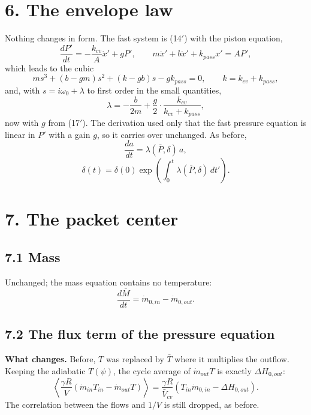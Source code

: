 \documentclass[11pt]{article}
\begin{document}
\section*{6. The envelope law}

Nothing changes in form. The fast system is (14$'$) with the piston equation,
\begin{equation}
\frac{dP'}{dt} = -\frac{k_{cv}}{A}\dot x' + gP', \qquad m\ddot x' + b\dot x' + k_{pass}x' = AP' , \tag{18}
\end{equation}
which leads to the cubic
\begin{equation}
ms^3 + (b - gm)s^2 + (k - gb)s - gk_{pass} = 0 , \qquad k = k_{cv} + k_{pass} , \tag{19}
\end{equation}
and, with $s = i\omega_0 + \lambda$ to first order in the small quantities,
\begin{equation}
\lambda = -\frac{b}{2m} + \frac{g}{2}\cdot\frac{k_{cv}}{k_{cv} + k_{pass}} , \tag{20}
\end{equation}
now with $g$ from (17$'$). The derivation used only that the fast pressure equation is linear in $P'$ with a gain $g$, so it carries over unchanged. As before,
\begin{equation}
\frac{da}{dt} = \lambda(\bar P,\delta)\,a , \tag{21}
\end{equation}
\begin{equation}
\delta(t) = \delta(0)\exp\left(\int_0^t\lambda(\bar P,\delta)\,dt'\right) . \tag{22}
\end{equation}

\section*{7. The packet center}

\subsection*{7.1 Mass}

Unchanged; the mass equation contains no temperature:
\begin{equation}
\frac{d\bar M}{dt} = \dot m_{0,in} - \dot m_{0,out} . \tag{23}
\end{equation}

\subsection*{7.2 The flux term of the pressure equation}

\textbf{What changes.} Before, $T$ was replaced by $\bar T$ where it multiplies the outflow. Keeping the adiabatic $T(\psi)$, the cycle average of $\dot m_{out}T$ is exactly $\Delta H_{0,out}$:
\[
\left\langle\frac{\gamma R}{V}\left(\dot m_{in}T_{in} - \dot m_{out}T\right)\right\rangle = \frac{\gamma R}{\bar V_{cv}}\left(T_{in}\dot m_{0,in} - \Delta H_{0,out}\right) .
\]
The correlation between the flows and $1/V$ is still dropped, as before.
\end{document}
